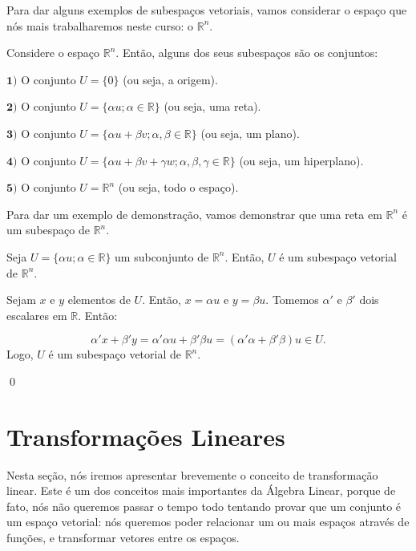 Para dar alguns exemplos de subespaços vetoriais, vamos considerar o espaço que nós mais trabalharemos neste curso: o $\mathbb{R}^n$.

\begin{Example}
	Considere o espaço $\mathbb{R}^n$. Então, alguns dos seus subespaços são os conjuntos:
	
	$\mathbf{1)}$ O conjunto $U = \{0\}$ (ou seja, a origem).
	
	$\mathbf{2)}$ O conjunto $U = \{\alpha u; \alpha\in\mathbb{R}\}$ (ou seja, uma reta).
	
	$\mathbf{3)}$ O conjunto $U = \{\alpha u + \beta v; \alpha,\beta\in\mathbb{R}\}$ (ou seja, um plano).
	
	$\mathbf{4)}$ O conjunto $U = \{\alpha u + \beta v + \gamma w; \alpha,\beta,\gamma\in\mathbb{R}\}$ (ou seja, um hiperplano).
	
	$\mathbf{5)}$ O conjunto $U = \mathbb{R}^n$ (ou seja, todo o espaço).
\end{Example}

Para dar um exemplo de demonstração, vamos demonstrar que uma reta em $\mathbb{R}^n$ é um subespaço de $\mathbb{R}^n$.

\begin{Proposition}
	Seja $U = \{\alpha u; \alpha\in\mathbb{R}\}$ um subconjunto de $\mathbb{R}^n$. Então, $U$ é um subespaço vetorial de $\mathbb{R}^n$.
\end{Proposition}

\begin{Proof}
	Sejam $x$ e $y$ elementos de $U$. Então, $x = \alpha u$ e $y = \beta u$. Tomemos $\alpha'$ e $\beta'$ dois escalares em $\mathbb{R}$. Então:
	
	$$
	\alpha'x + \beta'y = \alpha'\alpha u + \beta'\beta u = (\alpha'\alpha + \beta'\beta)u \in U.
	$$
	Logo, $U$ é um subespaço vetorial de $\mathbb{R}^n$.
	
	\qed
\end{Proof}

\section{Transformações Lineares}

Nesta seção, nós iremos apresentar brevemente o conceito de transformação linear. Este é um dos conceitos mais importantes da Álgebra Linear, porque de fato, nós não queremos passar o tempo todo tentando provar que um conjunto é um espaço vetorial: nós queremos poder relacionar um ou mais espaços através de funções, e transformar vetores entre os espaços.

